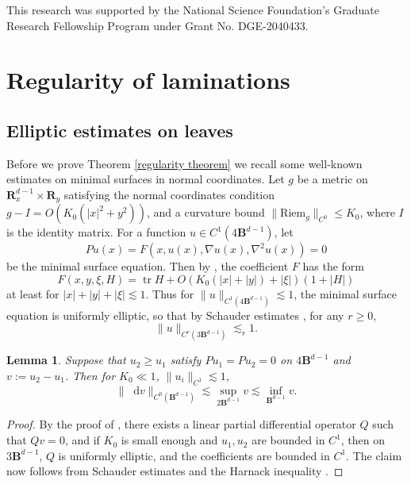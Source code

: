 \documentclass[reqno,11pt]{amsart}
\newcommand{\RR}{\mathbf{R}}
\newcommand{\Ball}{\mathbf{B}}
\newcommand*\dif{\mathop{}\!\mathrm{d}}
\DeclareMathOperator{\tr}{tr}
\newcommand{\Riem}{\mathrm{Riem}}
\newtheorem{lemma}[theorem]{Lemma}
\theoremstyle{definition}
\numberwithin{equation}{section}
\begin{document}
This research was supported by the National Science Foundation's Graduate Research Fellowship Program under Grant No. DGE-2040433.



\section{Regularity of laminations}\label{Regularity}
\subsection{Elliptic estimates on leaves}\label{Leaf estimates}
Before we prove Theorem \ref{regularity theorem} we recall some well-known estimates on minimal surfaces in normal coordinates.
Let $g$ be a metric on $\RR^{d - 1}_x \times \RR_y$ satisfying the normal coordinates condition $g - I = O(K_0(|x|^2 + y^2))$, and a curvature bound $\|\Riem_g\|_{C^0} \leq K_0$, where $I$ is the identity matrix.
For a function $u \in C^1(4\Ball^{d - 1})$, let
$$Pu(x) = F(x, u(x), \nabla u(x), \nabla^2 u(x)) = 0$$
be the minimal surface equation.
Then by \cite[(7.21)]{colding2011course}, the coefficient $F$ has the form
$$F(x, y, \xi, H) = \tr H + O(K_0(|x| + |y|) + |\xi|)(1 + |H|)$$
at least for $|x| + |y| + |\xi| \lesssim 1$.
Thus for $\|u\|_{C^1(4\Ball^{d - 1})} \lesssim 1$, the minimal surface equation is uniformly elliptic, so that by Schauder estimates \cite[Theorem 6.2]{gilbarg2015elliptic}, for any $r \geq 0$,
\begin{equation}\label{norms on uk}
	\|u\|_{C^r(3\Ball^{d - 1})} \lesssim_r 1.
\end{equation}

\begin{lemma}
Suppose that $u_2 \geq u_1$ satisfy $Pu_1 = Pu_2 = 0$ on $4\Ball^{d - 1}$ and $v := u_2 - u_1$.
Then for $K_0 \ll 1$, $\|u_i\|_{C^1} \lesssim 1$, 
\begin{equation}\label{Schauder Harnack}
	\|\dif v\|_{C^0(\Ball^{d - 1})} \lesssim \sup_{2\Ball^{d - 1}} v \lesssim \inf_{\Ball^{d - 1}} v.
\end{equation}
\end{lemma}
\begin{proof}
By the proof of \cite[Theorem 7.3]{colding2011course}, there exists a linear partial differential operator $Q$ such that $Qv = 0$, and if $K_0$ is small enough and $u_1, u_2$ are bounded in $C^1$, then on $3\Ball^{d - 1}$, $Q$ is uniformly elliptic, and the coefficients are bounded in $C^1$.
The claim now follows from Schauder estimates and the Harnack inequality \cite[Corollary 9.25]{gilbarg2015elliptic}.
\end{proof}
\end{document}
